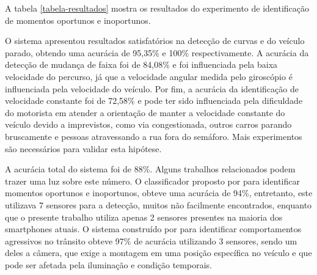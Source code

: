 A tabela \ref{tabela-resultados} mostra os resultados do experimento de identificação de momentos oportunos e inoportunos.

\begin{table}[h]
\centering
\caption{Resultados do experimento de identificação dos momentos}
\label{tabela-resultados}
\end{table}

O sistema apresentou resultados satisfatórios na detecção de curvas e do veículo parado, obtendo uma acurácia de 95,35\% e 100\% respectivamente. A
acurácia da detecção de mudança de faixa foi de 84,08\% e foi influenciada pela baixa velocidade do percurso, já que a velocidade angular medida pelo
giroscópio é influenciada pela velocidade do veículo. Por fim, a acurácia da identificação de velocidade constante foi de 72,58\% e pode ter sido
influenciada pela dificuldade do motorista em atender a orientação de manter a velocidade constante do veículo devido a imprevistos, como via congestionada,
outros carros parando bruscamente e pessoas atravessando a rua fora do semáforo. Mais experimentos são necessários para validar esta hipótese.

A acurácia total do sistema foi de 88\%. Alguns trabalhos relacionados podem trazer uma luz sobre este número. O classificador proposto por
 para identificar momentos oportunos e inoportunos, obteve uma acurácia de 94\%, entretanto, este utilizava 7
sensores para a detecção, muitos não facilmente encontrados, enquanto que o presente trabalho utiliza apenas 2 sensores presentes na maioria dos
smartphones atuais. O sistema construído por  para identificar comportamentos agressivos no trânsito obteve
97\% de acurácia utilizando 3 sensores, sendo um deles a câmera, que exige a montagem em uma posição específica no veículo e que pode ser afetada
pela iluminação e condição temporais.
